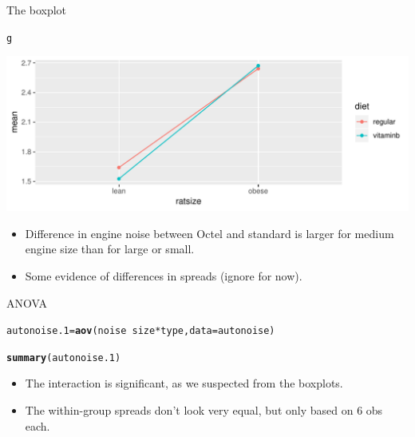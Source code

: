 \documentclass[unknownkeysallowed]{beamer}\usepackage[]{graphicx}\usepackage[]{color}
\makeatletter
\def\maxwidth{ %
  \ifdim\Gin@nat@width>\linewidth
    \linewidth
  \else
    \Gin@nat@width
  \fi
}
\newcommand{\hlopt}[1]{\textcolor[rgb]{0,0,0}{#1}}%
\newcommand{\hlstd}[1]{\textcolor[rgb]{0.345,0.345,0.345}{#1}}%
\newcommand{\hlkwb}[1]{\textcolor[rgb]{0.69,0.353,0.396}{#1}}%
\newcommand{\hlkwc}[1]{\textcolor[rgb]{0.333,0.667,0.333}{#1}}%
\newcommand{\hlkwd}[1]{\textcolor[rgb]{0.737,0.353,0.396}{\textbf{#1}}}%
\newenvironment{kframe}{%
 \def\at@end@of@kframe{}%
 \ifinner\ifhmode%
  \def\at@end@of@kframe{\end{minipage}}%
  \begin{minipage}{\columnwidth}%
 \fi\fi%
 \def\FrameCommand##1{\hskip\@totalleftmargin \hskip-\fboxsep
 \colorbox{shadecolor}{##1}\hskip-\fboxsep
     \hskip-\linewidth \hskip-\@totalleftmargin \hskip\columnwidth}%
 \MakeFramed {\advance\hsize-\width
   \@totalleftmargin\z@ \linewidth\hsize
   \@setminipage}}%
 {\par\unskip\endMakeFramed%
 \at@end@of@kframe}
\newenvironment{knitrout}{}{} %
\makeatother
\begin{document}
\begin{frame}[fragile]{The boxplot}
\begin{knitrout}
\color{fgcolor}\begin{kframe}
\begin{alltt}
\hlstd{g}
\end{alltt}
\end{kframe}
\includegraphics[width=\maxwidth]{figure/unnamed-chunk-172-1} 

\end{knitrout}

\begin{itemize}
\item Difference in engine noise between Octel and standard is larger for
medium engine size than for large or small.
\item Some evidence of differences in spreads (ignore for now).
\end{itemize}

\end{frame}


\begin{frame}[fragile]{ANOVA}
  
\begin{knitrout}\small
{}\color{fgcolor}\begin{kframe}
\begin{alltt}
\hlstd{autonoise.1}\hlkwb{=}\hlkwd{aov}\hlstd{(noise}\hlopt{~}\hlstd{size}\hlopt{*}\hlstd{type,}\hlkwc{data}\hlstd{=autonoise)}
\end{alltt}


{\ttfamily\noindent\bfseries{}}\begin{alltt}
\hlkwd{summary}\hlstd{(autonoise.1)}
\end{alltt}


{\ttfamily\noindent\bfseries\color{errorcolor}{\#\# Error in summary(autonoise.1): object 'autonoise.1' not found}}\end{kframe}
\end{knitrout}

\begin{itemize}
\item The interaction is significant, as we suspected from the boxplots.
\item The within-group spreads don't look very equal, but only based
  on 6 obs each.
\end{itemize}
  
\end{frame}
\end{document}

